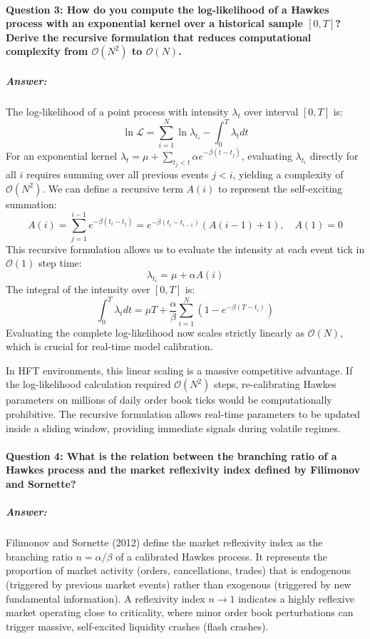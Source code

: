 \documentclass[11pt,a4paper]{article}
\begin{document}
\paragraph{Question 3: How do you compute the log-likelihood of a Hawkes process with an exponential kernel over a historical sample $[0, T]$? Derive the recursive formulation that reduces computational complexity from $\mathcal{O}(N^2)$ to $\mathcal{O}(N)$.}
\subparagraph{Answer:}
The log-likelihood of a point process with intensity $\lambda_t$ over interval $[0, T]$ is:
\begin{equation}
    \ln \mathcal{L} = \sum_{i=1}^N \ln \lambda_{t_i} - \int_{0}^{T} \lambda_t dt
\end{equation}
For an exponential kernel $\lambda_t = \mu + \sum_{t_j < t} \alpha e^{-\beta(t - t_j)}$, evaluating $\lambda_{t_i}$ directly for all $i$ requires summing over all previous events $j < i$, yielding a complexity of $\mathcal{O}(N^2)$.
We can define a recursive term $A(i)$ to represent the self-exciting summation:
\begin{equation}
    A(i) = \sum_{j=1}^{i-1} e^{-\beta(t_i - t_j)} = e^{-\beta(t_i - t_{i-1})} \left( A(i-1) + 1 \right), \quad A(1) = 0
\end{equation}
This recursive formulation allows us to evaluate the intensity at each event tick in $\mathcal{O}(1)$ step time:
\begin{equation}
    \lambda_{t_i} = \mu + \alpha A(i)
\end{equation}
The integral of the intensity over $[0, T]$ is:
\begin{equation}
    \int_{0}^{T} \lambda_t dt = \mu T + \frac{\alpha}{\beta} \sum_{i=1}^N \left( 1 - e^{-\beta(T - t_i)} \right)
\end{equation}
Evaluating the complete log-likelihood now scales strictly linearly as $\mathcal{O}(N)$, which is crucial for real-time model calibration.

In HFT environments, this linear scaling is a massive competitive advantage. If the log-likelihood calculation required $\mathcal{O}(N^2)$ steps, re-calibrating Hawkes parameters on millions of daily order book ticks would be computationally prohibitive. The recursive formulation allows real-time parameters to be updated inside a sliding window, providing immediate signals during volatile regimes.

\paragraph{Question 4: What is the relation between the branching ratio of a Hawkes process and the market reflexivity index defined by Filimonov and Sornette?}
\subparagraph{Answer:}
Filimonov and Sornette (2012) define the market reflexivity index as the branching ratio $n = \alpha/\beta$ of a calibrated Hawkes process. It represents the proportion of market activity (orders, cancellations, trades) that is endogenous (triggered by previous market events) rather than exogenous (triggered by new fundamental information). A reflexivity index $n \to 1$ indicates a highly reflexive market operating close to criticality, where minor order book perturbations can trigger massive, self-excited liquidity crashes (flash crashes).
\end{document}
